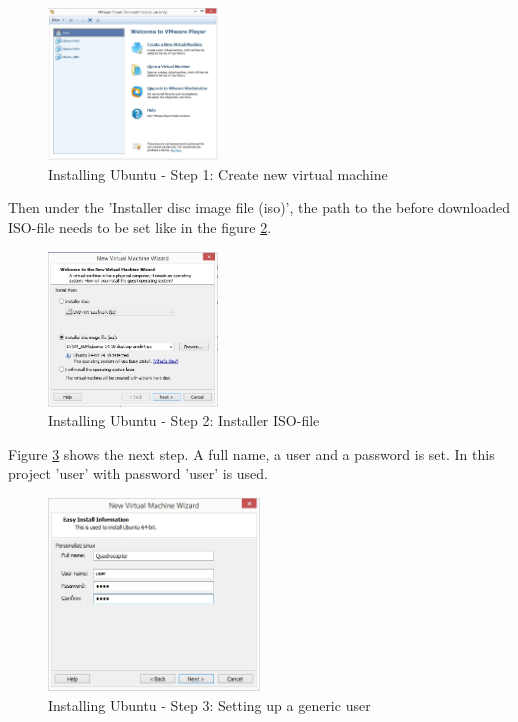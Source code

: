 \begin{figure}[H]
	\centering\includegraphics[width=0.4\textwidth]{fig/Dev_Concept/Ub1.jpg}
	\caption{Installing Ubuntu - Step 1: Create new virtual machine}
	\label{fig:Ub1}
\end{figure}

Then under the 'Installer disc image file (iso)', the path to the before downloaded ISO-file needs to be set like in the figure \ref{fig:Ub2}.

\begin{figure}[H]
	\centering\includegraphics[width=0.4\textwidth]{fig/Dev_Concept/Ub2.jpg}
	\caption{Installing Ubuntu - Step 2: Installer ISO-file}
	\label{fig:Ub2}
\end{figure}

Figure \ref{fig:Ub3} shows the next step. A full name, a user and a password is set. In this project 'user' with password 'user' is used.

\begin{figure}[H]
	\centering\includegraphics[width=0.5\textwidth]{fig/Dev_Concept/Ub3.jpg}
	\caption{Installing Ubuntu - Step 3: Setting up a generic user}
	\label{fig:Ub3}
\end{figure}

